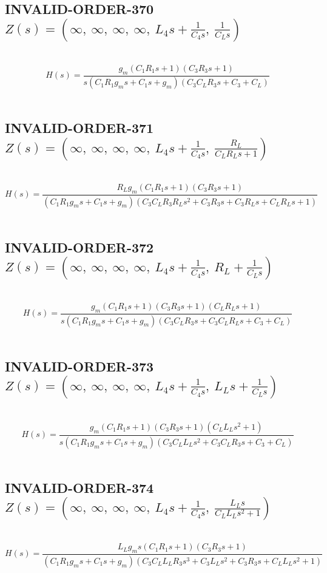 \documentclass{article}
\begin{document}
\subsection{INVALID-ORDER-370 $Z(s) = \left( \infty, \  \infty, \  \infty, \  \infty, \  L_{4} s + \frac{1}{C_{4} s}, \  \frac{1}{C_{L} s}\right)$ } \ 
\textbf{\[H(s) = \frac{g_{m} \left(C_{1} R_{1} s + 1\right) \left(C_{3} R_{3} s + 1\right)}{s \left(C_{1} R_{1} g_{m} s + C_{1} s + g_{m}\right) \left(C_{3} C_{L} R_{3} s + C_{3} + C_{L}\right)}\] } \ 
\subsection{INVALID-ORDER-371 $Z(s) = \left( \infty, \  \infty, \  \infty, \  \infty, \  L_{4} s + \frac{1}{C_{4} s}, \  \frac{R_{L}}{C_{L} R_{L} s + 1}\right)$ } \ 
\textbf{\[H(s) = \frac{R_{L} g_{m} \left(C_{1} R_{1} s + 1\right) \left(C_{3} R_{3} s + 1\right)}{\left(C_{1} R_{1} g_{m} s + C_{1} s + g_{m}\right) \left(C_{3} C_{L} R_{3} R_{L} s^{2} + C_{3} R_{3} s + C_{3} R_{L} s + C_{L} R_{L} s + 1\right)}\] } \ 
\subsection{INVALID-ORDER-372 $Z(s) = \left( \infty, \  \infty, \  \infty, \  \infty, \  L_{4} s + \frac{1}{C_{4} s}, \  R_{L} + \frac{1}{C_{L} s}\right)$ } \ 
\textbf{\[H(s) = \frac{g_{m} \left(C_{1} R_{1} s + 1\right) \left(C_{3} R_{3} s + 1\right) \left(C_{L} R_{L} s + 1\right)}{s \left(C_{1} R_{1} g_{m} s + C_{1} s + g_{m}\right) \left(C_{3} C_{L} R_{3} s + C_{3} C_{L} R_{L} s + C_{3} + C_{L}\right)}\] } \ 
\subsection{INVALID-ORDER-373 $Z(s) = \left( \infty, \  \infty, \  \infty, \  \infty, \  L_{4} s + \frac{1}{C_{4} s}, \  L_{L} s + \frac{1}{C_{L} s}\right)$ } \ 
\textbf{\[H(s) = \frac{g_{m} \left(C_{1} R_{1} s + 1\right) \left(C_{3} R_{3} s + 1\right) \left(C_{L} L_{L} s^{2} + 1\right)}{s \left(C_{1} R_{1} g_{m} s + C_{1} s + g_{m}\right) \left(C_{3} C_{L} L_{L} s^{2} + C_{3} C_{L} R_{3} s + C_{3} + C_{L}\right)}\] } \ 
\subsection{INVALID-ORDER-374 $Z(s) = \left( \infty, \  \infty, \  \infty, \  \infty, \  L_{4} s + \frac{1}{C_{4} s}, \  \frac{L_{L} s}{C_{L} L_{L} s^{2} + 1}\right)$ } \ 
\textbf{\[H(s) = \frac{L_{L} g_{m} s \left(C_{1} R_{1} s + 1\right) \left(C_{3} R_{3} s + 1\right)}{\left(C_{1} R_{1} g_{m} s + C_{1} s + g_{m}\right) \left(C_{3} C_{L} L_{L} R_{3} s^{3} + C_{3} L_{L} s^{2} + C_{3} R_{3} s + C_{L} L_{L} s^{2} + 1\right)}\] } \ 
\end{document}

